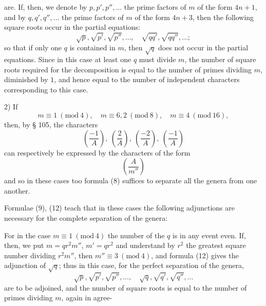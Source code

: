 are. If, then, we denote by $p, p', p'', \ldots$ the prime factors of $m$ of the form $4n+1$, and by $q, q', q'', \ldots$ the prime factors of $m$ of the form $4n+3$, then the following square roots occur in the partial equations:
\[
\sqrt{p}, \sqrt{p'}, \sqrt{p''}, \ldots, \quad \sqrt{qq'}, \sqrt{qq''}, \ldots;
\]
so that if only one $q$ is contained in $m$, then $\sqrt{q}$ does not occur in the partial equations. Since in this case at least one $q$ must divide $m$, the number of square roots required for the decomposition is equal to the number of primes dividing $m$, diminished by $1$, and hence equal to the number of independent characters corresponding to this case.

2) If
\[
m\equiv 1\ (\mathrm{mod}\ 4), \quad m\equiv 6, 2\ (\mathrm{mod}\ 8), \quad m\equiv 4\ (\mathrm{mod}\ 16),
\]
then, by § 105, the characters
\[
\left(\frac{-1}{A}\right), \ \left(\frac{2}{A}\right), \ \left(\frac{-2}{A}\right), \ \left(\frac{-1}{A}\right)
\]
can respectively be expressed by the characters of the form
\[
\left(\frac{A}{m''}\right)
\]
and so in these cases too formula (8) suffices to separate all the genera from one another.

Formulae (9), (12) teach that in these cases the following adjunctions are necessary for the complete separation of the genera:

For in the case $m\equiv 1 \ (\mathrm{mod}\ 4)$ the number of the $q$ is in any event even. If, then, we put $m = q r^2 m''$, $m' = q r^2$ and understand by $r^2$ the greatest square number dividing $r^2 m''$, then $m''\equiv 3 \ (\mathrm{mod}\ 4)$, and formula (12) gives the adjunction of $\sqrt{q}$; thus in this case, for the perfect separation of the genera,
\[
\sqrt{p}, \sqrt{p'}, \sqrt{p''}, \ldots, \quad \sqrt{q}, \sqrt{q'}, \sqrt{q''}, \ldots
\]
are to be adjoined, and the number of square roots is equal to the number of primes dividing $m$, again in agree-
